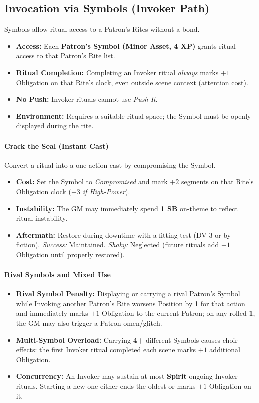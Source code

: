 \subsection{Invocation via Symbols (Invoker Path)}
Symbols allow ritual access to a Patron's Rites without a bond.
\begin{itemize}
  \item \textbf{Access:} Each \textbf{Patron’s Symbol (Minor Asset, 4 XP)} grants ritual access to that Patron's Rite list.
  \item \textbf{Ritual Completion:} Completing an Invoker ritual \emph{always} marks $+1$ Obligation on that Rite's clock, even outside scene context (attention cost).
  \item \textbf{No Push:} Invoker rituals cannot use \emph{Push It}.
  \item \textbf{Environment:} Requires a suitable ritual space; the Symbol must be openly displayed during the rite.
\end{itemize}

\paragraph{Crack the Seal (Instant Cast)}
Convert a ritual into a one-action cast by compromising the Symbol.
\begin{itemize}
  \item \textbf{Cost:} Set the Symbol to \emph{Compromised} and mark $+2$ segments on that Rite's Obligation clock (\emph{$+3$ if High-Power}).
  \item \textbf{Instability:} The GM may immediately spend \textbf{1 SB} on-theme to reflect ritual instability.
  \item \textbf{Aftermath:} Restore during downtime with a fitting test (DV 3 or by fiction). \emph{Success:} Maintained. \emph{Shaky:} Neglected (future rituals add $+1$ Obligation until properly restored).
\end{itemize}

\paragraph{Rival Symbols and Mixed Use}
\begin{itemize}
  \item \textbf{Rival Symbol Penalty:} Displaying or carrying a rival Patron's Symbol while Invoking another Patron’s Rite worsens Position by 1 for that action and immediately marks $+1$ Obligation to the current Patron; on any rolled \textbf{1}, the GM may also trigger a Patron omen/glitch.
  \item \textbf{Multi-Symbol Overload:} Carrying \textbf{4+} different Symbols causes choir effects: the first Invoker ritual completed each scene marks $+1$ additional Obligation.
  \item \textbf{Concurrency:} An Invoker may sustain at most \textbf{Spirit} ongoing Invoker rituals. Starting a new one either ends the oldest or marks $+1$ Obligation on it.
\end{itemize}

